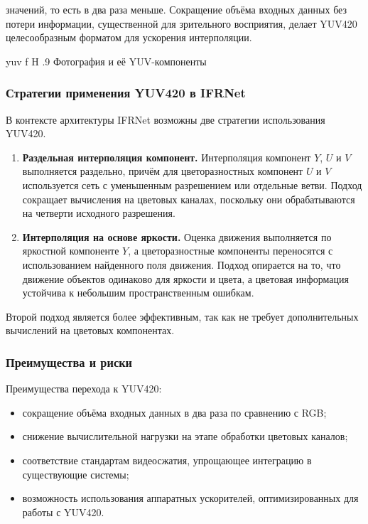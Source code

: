 значений, то есть в два раза меньше. Сокращение объёма входных данных без потери информации, существенной для зрительного восприятия, делает YUV420 целесообразным форматом для ускорения интерполяции.

{yuv}
{f}
{H}
{.9\textwidth}
{Фотография и её YUV-компоненты}

\subsubsection*{Стратегии применения YUV420 в IFRNet}

В контексте архитектуры IFRNet возможны две стратегии использования YUV420.

\begin{enumerate}
	\item \textbf{Раздельная интерполяция компонент.} Интерполяция компонент $Y$, $U$ и $V$ выполняется раздельно, причём для цветоразностных компонент $U$ и $V$ используется сеть с уменьшенным разрешением или отдельные ветви. Подход сокращает вычисления на цветовых каналах, поскольку они обрабатываются на четверти исходного разрешения.

	\item \textbf{Интерполяция на основе яркости.} Оценка движения выполняется по яркостной компоненте $Y$, а цветоразностные компоненты переносятся с использованием найденного поля движения. Подход опирается на то, что движение объектов одинаково для яркости и цвета, а цветовая информация устойчива к небольшим пространственным ошибкам.
\end{enumerate}

Второй подход является более эффективным, так как не требует дополнительных вычислений на цветовых компонентах.

\subsubsection*{Преимущества и риски}

Преимущества перехода к YUV420:
\begin{itemize}
	\item сокращение объёма входных данных в два раза по сравнению с RGB;
	\item снижение вычислительной нагрузки на этапе обработки цветовых каналов;
	\item соответствие стандартам видеосжатия, упрощающее интеграцию в существующие системы;
	\item возможность использования аппаратных ускорителей, оптимизированных для работы с YUV420.
\end{itemize}

